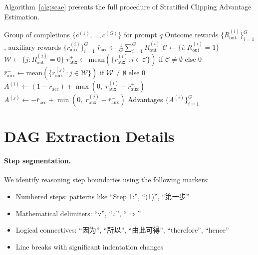 Algorithm~\ref{alg:scae} presents the full procedure of Stratified
Clipping Advantage Estimation.

\begin{algorithm}[H]
\caption{Stratified Clipping Advantage Estimation (SCAE)}
\label{alg:scae}
\begin{algorithmic}[1]
\REQUIRE Group of completions $\{c^{(1)}, \ldots, c^{(G)}\}$ for prompt $q$
\REQUIRE Outcome rewards $\{R_\mathrm{out}^{(i)}\}_{i=1}^G$, auxiliary rewards $\{r_\mathrm{aux}^{(i)}\}_{i=1}^G$
\STATE $\bar{r}_\mathrm{acc} \leftarrow \frac{1}{G}\sum_{i=1}^G R_\mathrm{out}^{(i)}$
\STATE $\mathcal{C} \leftarrow \{i : R_\mathrm{out}^{(i)} = 1\}$ \hfill {}
\STATE $\mathcal{W} \leftarrow \{j : R_\mathrm{out}^{(j)} = 0\}$ \hfill {}
\STATE $\bar{r}_\mathrm{aux}^+ \leftarrow \mathrm{mean}(\{r_\mathrm{aux}^{(i)} : i \in \mathcal{C}\})$ if $\mathcal{C} \neq \emptyset$ else $0$
\STATE $\bar{r}_\mathrm{aux}^- \leftarrow \mathrm{mean}(\{r_\mathrm{aux}^{(j)} : j \in \mathcal{W}\})$ if $\mathcal{W} \neq \emptyset$ else $0$
    \STATE $A^{(i)} \leftarrow (1 - \bar{r}_\mathrm{acc}) + \max(0,\; r_\mathrm{aux}^{(i)} - \bar{r}_\mathrm{aux}^+)$
\ENDFOR
{}
    \STATE $A^{(j)} \leftarrow -\bar{r}_\mathrm{acc} + \min(0,\; r_\mathrm{aux}^{(j)} - \bar{r}_\mathrm{aux}^-)$
\ENDFOR
\RETURN Advantages $\{A^{(i)}\}_{i=1}^G$
\end{algorithmic}
\end{algorithm}

\section{DAG Extraction Details}
\label{app:dag}

\paragraph{Step segmentation.}
We identify reasoning step boundaries using the following markers:
\begin{itemize}[leftmargin=*,itemsep=1pt]
    \item Numbered steps: patterns like ``Step 1:'', ``(1)'', ``第一步''
    \item Mathematical delimiters: ``$\because$'', ``$\therefore$'',
          ``$\Rightarrow$''
    \item Logical connectives: ``因为'', ``所以'', ``由此可得'', ``therefore'',
          ``hence''
    \item Line breaks with significant indentation changes
\end{itemize}

